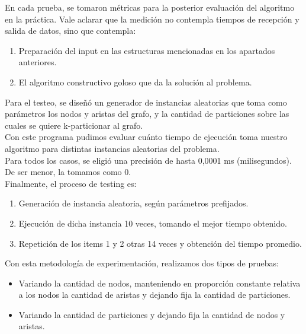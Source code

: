 \documentclass[10pt,a4paper]{article}
\begin{document}
\noindent En cada prueba, se tomaron métricas para la posterior evaluación del algoritmo en la práctica. Vale aclarar que la medición no contempla tiempos de recepción y salida de datos, sino que contempla:\\

\noindent \begin{enumerate}
\item Preparación del input en las estructuras mencionadas en los apartados anteriores.
\item El algoritmo constructivo goloso que da la solución al problema.\\
\end{enumerate}

\noindent Para el testeo, se diseñó un generador de instancias aleatorias que toma como parámetros los nodos y aristas del grafo, y la cantidad de particiones sobre las cuales se quiere k-particionar al grafo.\\

\noindent Con este programa pudimos evaluar cuánto tiempo de ejecución toma nuestro algoritmo para distintas instancias aleatorias del problema.\\

\noindent Para todos los casos, se eligió una precisión de hasta 0,0001 ms (milisegundos). De ser menor, la tomamos como 0.\\

\noindent Finalmente, el proceso de testing es:\\

\noindent \begin{enumerate}
\item Generación de instancia aleatoria, según parámetros prefijados.
\item Ejecución de dicha instancia 10 veces, tomando el mejor tiempo obtenido.
\item Repetición de los items 1 y 2 otras 14 veces y obtención del tiempo promedio.
\end{enumerate}

\noindent Con esta metodología de experimentación, realizamos dos tipos de pruebas:\\

\noindent \begin{itemize}
\item Variando la cantidad de nodos, manteniendo en proporción constante relativa a los nodos la cantidad de aristas y dejando fija la cantidad de particiones.
\item Variando la cantidad de particiones y dejando fija la cantidad de nodos y aristas.\\
\end{itemize}
\end{document}
